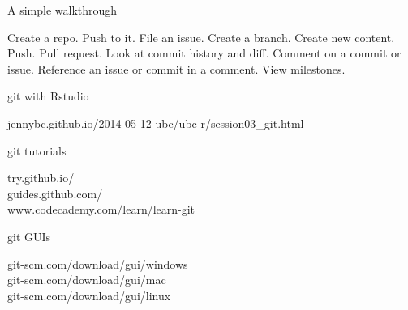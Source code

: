 \documentclass[12pt]{beamer}
\begin{document}
\begin{frame}

	\begin{flushright}
  	\Large \textcolor{boss2}{A simple walkthrough} 
	\end{flushright}

Create a repo. Push to it. File an issue. Create a branch. Create new content. Push. Pull request. Look at commit history and diff. Comment on a commit or issue. Reference an issue or commit in a comment. View milestones.  


\end{frame}















\begin{frame}

	\begin{flushright}
		{\Large \textcolor{boss2}{git with Rstudio}} \\
	\end{flushright}
		jennybc.github.io/2014-05-12-ubc/ubc-r/session03\_git.html \\
		\bigskip
	\begin{flushright}
		{\Large \textcolor{boss2}{git tutorials}} \\
	\end{flushright}
		try.github.io/ \\
		guides.github.com/ \\
		www.codecademy.com/learn/learn-git \\
		\bigskip
	\begin{flushright}
		{\Large \textcolor{boss2}{git GUIs}} \\
	\end{flushright}
		git-scm.com/download/gui/windows	\\
		git-scm.com/download/gui/mac \\
		git-scm.com/download/gui/linux \\
\end{frame}
\end{document}
